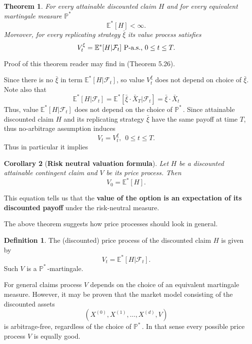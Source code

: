 \documentclass[a4paper,11pt, twoside]{book}
\newtheorem{thm}{Theorem}[chapter]
\newtheorem{coro}[thm]{Corollary}
\theoremstyle{definition}
\newtheorem{mydef}{Definition}[chapter]
\theoremstyle{remark}
\def\Em{{\mathbb{E}^*}}
\def\Pm{{\mathbb{P}}^*\,}
\def\Xa{\bar{X}}
\def\xia{\bar{\xi}}
\begin{document}
\begin{thm}
 For every attainable discounted claim $H$ and for every equivalent martingale measure $\Pm$
 \[ \Em [H] < \infty. \]
 Moreover, for every replicating strategy $\xia$ its value process satisfies
 \begin{equation}
  V^\xi_t = \Em[H | \mathcal{F}_t] \hbox{ P-a.s., } 0 \leq t \leq T .
 \end{equation}
\end{thm}
Proof of this theorem reader may find in \cite{follmer} (Theorem 5.26).

Since there is no $\xia$ in term $\Em[H | \mathcal{F}_t]$, so value $V^\xi_t$ does not depend on choice of $\xia$. Note also that
\begin{equation*}
 \Em[H | \mathcal{F}_t]  = \Em[\xia \cdot \Xa_T | \mathcal{F}_t]  = \xia \cdot \Xa_t
\end{equation*}
Thus, value $\Em[H | \mathcal{F}_t]$ does not depend on the choice of $\Pm$. 
Since attainable discounted claim $H$ and its replicating strategy $\xia$ have the same payoff at time $T$, thus no-arbitrage assumption induces
\[ V_t = V^\xi_t,\ \ 0 \leq t \leq T. \]
Thus in particular it implies
\begin{coro}[\textbf{Risk neutral valuation formula}]
\label{coro:price_mth}
Let $H$ be a discounted attainable contingent claim and $V$ be its price process. Then
\begin{equation}
 \label{eq:price_mtg}
 V_0 = \Em[H].
\end{equation}
\end{coro}
\noindent This equation tells us that the \textbf{value of the option is an expectation of its discounted payoff} under the risk-neutral measure.

The above theorem suggests how price processes should look in general.
\begin{mydef}
 The (discounted) price process of the discounted claim $H$ is given by
 \begin{equation*}
  V_t = \Em[H | \mathcal{F}_t].
 \end{equation*}
 Such $V$ is a $\Pm$-martingale.
\end{mydef}
For general claims process $V$ depends on the choice of an equivalent martingale measure. However, it may be proven that the market model consisting of the discounted assets
\[(X^{(0)}, X^{(1)},\ldots,X^{(d)}, V)\]
is arbitrage-free, regardless of the choice of $\Pm$. In that sense every possible price process $V$ is equally good.
\end{document}
